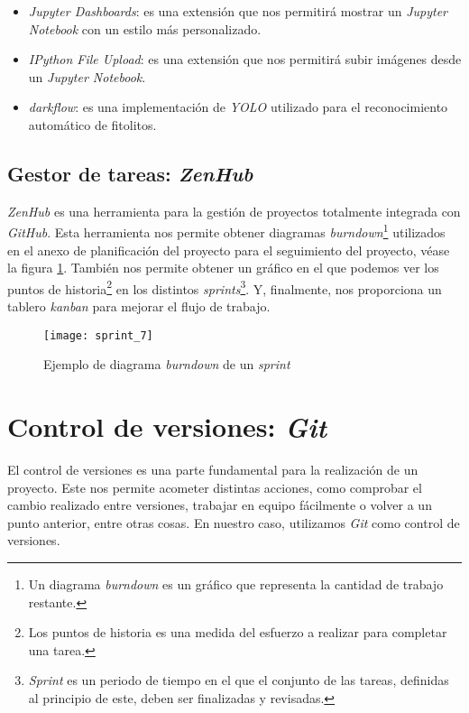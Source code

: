 \begin{itemize}
	\item \textit{Jupyter Dashboards}: es una extensión que nos permitirá mostrar un \textit{Jupyter Notebook} con un estilo más personalizado.
	\item \textit{IPython File Upload}: es una extensión que nos permitirá subir imágenes desde un \textit{Jupyter Notebook}.
	\item \textit{darkflow}: es una implementación de \textit{YOLO} utilizado para el reconocimiento automático de fitolitos.
\end{itemize}

\subsection{Gestor de tareas: \textit{ZenHub}}

\textit{ZenHub} es una herramienta para la gestión de proyectos totalmente integrada con \textit{GitHub}. Esta herramienta nos permite obtener diagramas \textit{burndown}\footnote{Un diagrama \textit{burndown} es un gráfico que representa la cantidad de trabajo restante.} utilizados en el anexo de planificación del proyecto para el seguimiento del proyecto, véase la figura \ref{fig:4.2.1}. También nos permite obtener un gráfico en el que podemos ver los puntos de historia\footnote{Los puntos de historia es una medida del esfuerzo a realizar para completar una tarea.} en los distintos \textit{sprints}\footnote{\textit{Sprint} es un periodo de tiempo en el que el conjunto de las tareas, definidas al principio de este, deben ser finalizadas y revisadas.}. Y, finalmente, nos proporciona un tablero \textit{kanban} para mejorar el flujo de trabajo.

\begin{figure}[h]
\centering
\texttt{[image: sprint\_7]}
\caption{Ejemplo de diagrama \textit{burndown} de un  \textit{sprint}}
\label{fig:4.2.1}
\end{figure}

\section{Control de versiones: \textit{Git}}

El control de versiones es una parte fundamental para la realización de un proyecto. Este nos permite acometer distintas acciones, como comprobar el cambio realizado entre versiones, trabajar en equipo fácilmente o volver a un punto anterior, entre otras cosas. En nuestro caso, utilizamos \textit{Git} como control de versiones. 

